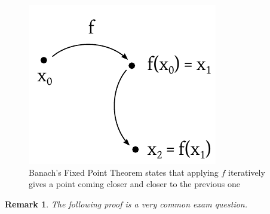 \documentclass{article}
\newtheorem{remark}{Remark}  \numberwithin{remark}{section}
\begin{document}
\begin{figure}[t]
  \begin{center}
    \includegraphics{img/07b_banach_fixed_point_theorem.pdf}
    \caption{Banach's Fixed Point Theorem states that applying $f$ iteratively gives a point coming closer and closer to the previous one}
    \label{img:banachfixed}
  \end{center}
\end{figure}

\begin{remark}
  The following proof is a very common exam question.
\end{remark}
\end{document}
